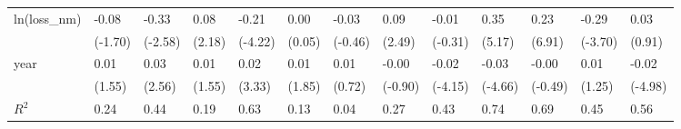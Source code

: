 \begin{tabular}{p{1.5cm} p{1.7cm} p{1.7cm} p{1.7cm}  p{1.7cm} p{1.7cm} p{1.7cm} p{1.7cm} p{1.7cm}  p{1.7cm} p{1.7cm} p{1.7cm} p{1.7cm} }
\hline
ln(loss\_nm)     &    -0.08         &    -0.33\sym{*}  &     0.08\sym{*}  &    -0.21\sym{***}&     0.00         &    -0.03         &     0.09\sym{*}  &    -0.01         &     0.35\sym{***}&     0.23\sym{***}&    -0.29\sym{**} &     0.03         \\
                &  (-1.70)         &  (-2.58)         &   (2.18)         &  (-4.22)         &   (0.05)         &  (-0.46)         &   (2.49)         &  (-0.31)         &   (5.17)         &   (6.91)         &  (-3.70)         &   (0.91)         \\
year            &     0.01         &     0.03\sym{*}  &     0.01         &     0.02\sym{**} &     0.01         &     0.01         &    -0.00         &    -0.02\sym{***}&    -0.03\sym{***}&    -0.00         &     0.01         &    -0.02\sym{***}\\
                &   (1.55)         &   (2.56)         &   (1.55)         &   (3.33)         &   (1.85)         &   (0.72)         &  (-0.90)         &  (-4.15)         &  (-4.66)         &  (-0.49)         &   (1.25)         &  (-4.98)         \\
\hline
\(R^{2}\)       &     0.24         &     0.44         &     0.19         &     0.63         &     0.13         &     0.04         &     0.27         &     0.43         &     0.74         &     0.69         &     0.45         &     0.56         \\
\end{tabular}
